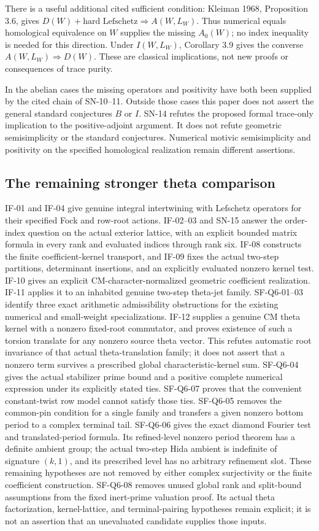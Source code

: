 \documentclass[11pt,a4paper]{article}
\theoremstyle{definition}
\theoremstyle{remark}
\begin{document}
There is a useful additional cited sufficient condition:
Kleiman 1968, Proposition 3.6, gives
$D(W)+\text{hard Lefschetz}\Rightarrow A(W,L_W)$.
Thus numerical equals homological equivalence on $W$ supplies
the missing $A_0(W)$; no index inequality is needed for this
direction. Under $I(W,L_W)$, Corollary 3.9 gives the converse
$A(W,L_W)\Rightarrow D(W)$. These are classical implications,
not new proofs or consequences of trace purity.

In the abelian cases the missing operators and positivity have
both been supplied by the cited chain of SN-10--11. Outside
those cases this paper does not assert the general standard
conjectures $B$ or $I$. SN-14 refutes the proposed formal
trace-only implication to the positive-adjoint argument. It
does not refute geometric semisimplicity or the standard conjectures.
Numerical motivic semisimplicity and positivity on the specified
homological realization remain different assertions.

\subsection{The remaining stronger theta comparison}
IF-01 and IF-04 give genuine integral intertwining with Lefschetz
operators for their specified Fock and row-root actions. IF-02--03 and SN-15
answer the order-index question on the actual exterior lattice, with
an explicit bounded matrix formula in every rank and evaluated indices
through rank six.
IF-08 constructs the finite coefficient-kernel transport, and
IF-09 fixes the actual two-step partitions, determinant insertions,
and an explicitly evaluated nonzero kernel test. IF-10 gives an
explicit CM-character-normalized geometric coefficient realization.
IF-11 applies it to an inhabited genuine two-step theta-jet family.
SF-Q6-01--03 identify three exact arithmetic admissibility obstructions
for the existing numerical and small-weight specializations.
IF-12 supplies a genuine CM theta kernel with a nonzero fixed-root
commutator, and proves existence of such a torsion translate for any
nonzero source theta vector. This refutes automatic root invariance
of that actual theta-translation family; it does not assert that a
nonzero term survives a prescribed global characteristic-kernel sum.
SF-Q6-04 gives the actual stabilizer prime bound and a positive
complete numerical expression under its explicitly stated ties.
SF-Q6-07 proves that the convenient constant-twist row model cannot
satisfy those ties. SF-Q6-05 removes the common-pin condition for
a single family and transfers a given nonzero bottom period to a
complex terminal tail. SF-Q6-06 gives the exact diamond Fourier
test and translated-period formula. Its refined-level nonzero
period theorem has a definite ambient group; the actual two-step
Hida ambient is indefinite of signature $(k,1)$, and its prescribed
level has no arbitrary refinement slot. These remaining hypotheses
are not removed by either complex surjectivity or the finite
coefficient construction.
SF-Q6-08 removes unused global rank and split-bound assumptions
from the fixed inert-prime valuation proof. Its actual theta
factorization, kernel-lattice, and terminal-pairing hypotheses
remain explicit; it is not an assertion that an unevaluated
candidate supplies those inputs.
\end{document}
